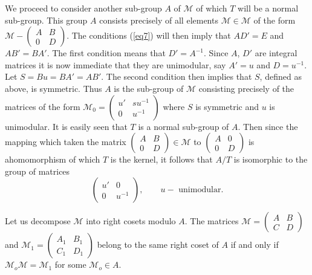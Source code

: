 We proceed to consider another sub-group $A$ of $\mathcal{M}$ of which
$T$ will 
be a normal sub-group. This group $A$ consists precisely of all 
elements $\mathcal{M} \in \mathcal{M}$ of the form $\mathcal{M}
- \begin{pmatrix} A & B \\ 0 & 
  D \end{pmatrix}$. The conditions (\ref{eq7}) will then imply that $AD'  =
E$ and $AB' = BA'$. The first condition means that $D' =
A^{-1}$. Since $A$, $D'$ are integral matrices it is now immediate that
they are unimodular, say $A' = u$ and $D = u^{-1}$. Let $S = Bu = BA'
= AB'$. The second condition then implies that $S$, defined as above,
is symmetric. Thus $A$ is the sub-group of $\mathcal{M}$ consisting
precisely of 
the matrices of the form $\mathcal{M}_0 = \begin{pmatrix} u' & su^{-1} \\ 0 &
  u^{-1} \end{pmatrix}$ where $S$ is symmetric and $u$ is
unimodular. It is easily seen that $T$ is a normal sub-group of
$A$. Then since the mapping which taken the matrix $\begin{pmatrix} A
  & B \\ 0 & D \end{pmatrix} \in \mathcal{M} $ to $\begin{pmatrix} A &
  0 \\ 0 & 
  D  \end{pmatrix}$ is a\pageoriginale  homomorphism of which $T$ is
the kernel, it 
follows that $A/T$ is isomorphic to the group of matrices 
\begin{equation*}
\begin{pmatrix} 
u' & 0 \\
0 & u^{-1} 
\end{pmatrix}
,\qquad u -\text{ unimodular}. \tag{16}\label{eq16}
\end{equation*}

Let us decompose $\mathcal{M}$ into right cosets modulo $A$. The
matrices $\mathcal{M} 
= \begin{pmatrix} A & B \\ C & D \end{pmatrix}$ and $\mathcal{M}_1
= \begin{pmatrix} A_1 & B_1 \\ C_1 & D_1 \end{pmatrix}$ belong to the
same right coset of $A$ if and only if $\mathcal{M}_o\mathcal{M} =
\mathcal{M}_1$ for some $\mathcal{M}_o \in 
A$. 

